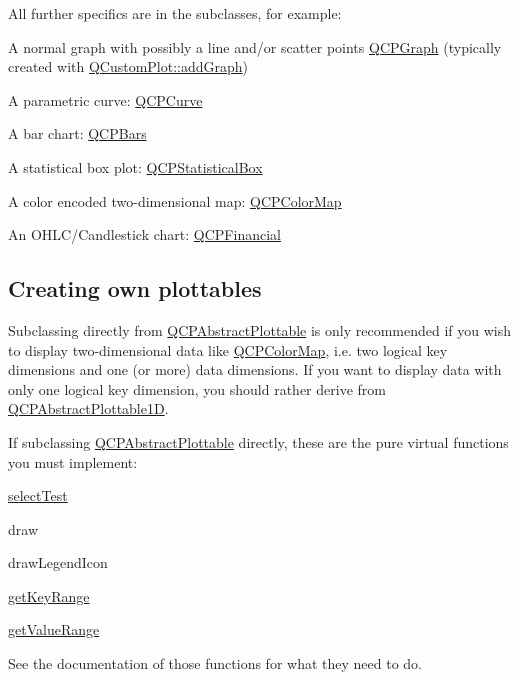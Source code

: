 All further specifics are in the subclasses, for example\+: \begin{DoxyItemize}
\item A normal graph with possibly a line and/or scatter points \mbox{\hyperlink{class_q_c_p_graph}{Q\+C\+P\+Graph}} (typically created with \mbox{\hyperlink{class_q_custom_plot_a6fb2873d35a8a8089842d81a70a54167}{Q\+Custom\+Plot\+::add\+Graph}}) \item A parametric curve\+: \mbox{\hyperlink{class_q_c_p_curve}{Q\+C\+P\+Curve}} \item A bar chart\+: \mbox{\hyperlink{class_q_c_p_bars}{Q\+C\+P\+Bars}} \item A statistical box plot\+: \mbox{\hyperlink{class_q_c_p_statistical_box}{Q\+C\+P\+Statistical\+Box}} \item A color encoded two-\/dimensional map\+: \mbox{\hyperlink{class_q_c_p_color_map}{Q\+C\+P\+Color\+Map}} \item An O\+H\+L\+C/\+Candlestick chart\+: \mbox{\hyperlink{class_q_c_p_financial}{Q\+C\+P\+Financial}}\end{DoxyItemize}
\hypertarget{class_q_c_p_abstract_plottable_plottables-subclassing}{}\subsection{Creating own plottables}\label{class_q_c_p_abstract_plottable_plottables-subclassing}
Subclassing directly from \mbox{\hyperlink{class_q_c_p_abstract_plottable}{Q\+C\+P\+Abstract\+Plottable}} is only recommended if you wish to display two-\/dimensional data like \mbox{\hyperlink{class_q_c_p_color_map}{Q\+C\+P\+Color\+Map}}, i.\+e. two logical key dimensions and one (or more) data dimensions. If you want to display data with only one logical key dimension, you should rather derive from \mbox{\hyperlink{class_q_c_p_abstract_plottable1_d}{Q\+C\+P\+Abstract\+Plottable1D}}.

If subclassing \mbox{\hyperlink{class_q_c_p_abstract_plottable}{Q\+C\+P\+Abstract\+Plottable}} directly, these are the pure virtual functions you must implement\+: \begin{DoxyItemize}
\item \mbox{\hyperlink{class_q_c_p_abstract_plottable_a38efe9641d972992a3d44204bc80ec1d}{select\+Test}} \item draw \item draw\+Legend\+Icon \item \mbox{\hyperlink{class_q_c_p_abstract_plottable_a4da16d3cd4b509e1104a9b0275623c96}{get\+Key\+Range}} \item \mbox{\hyperlink{class_q_c_p_abstract_plottable_a4de773988b21ed090fddd27c6a3a3dcb}{get\+Value\+Range}}\end{DoxyItemize}
See the documentation of those functions for what they need to do.


